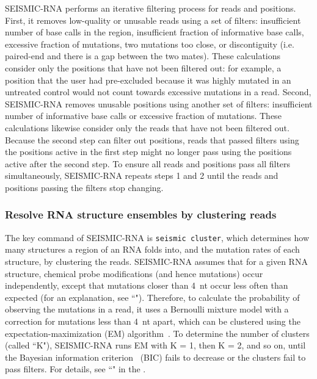 \documentclass[unnumsec,webpdf,contemporary,large]{oup-authoring-template}%
\theoremstyle{thmstyleone}%
\theoremstyle{thmstyletwo}%
\theoremstyle{thmstylethree}%
\begin{document}
SEISMIC-RNA performs an iterative filtering process for reads and positions.
First, it removes low-quality or unusable reads using a set of filters: insufficient number of base calls in the region, insufficient fraction of informative base calls, excessive fraction of mutations, two mutations too close, or discontiguity (i.e. paired-end and there is a gap between the two mates).
These calculations consider only the positions that have not been filtered out: for example, a position that the user had pre-excluded because it was highly mutated in an untreated control would not count towards excessive mutations in a read.
Second, SEISMIC-RNA removes unusable positions using another set of filters: insufficient number of informative base calls or excessive fraction of mutations.
These calculations likewise consider only the reads that have not been filtered out.
Because the second step can filter out positions, reads that passed filters using the positions active in the first step might no longer pass using the positions active after the second step.
To ensure all reads and positions pass all filters simultaneously, SEISMIC-RNA repeats steps 1 and 2 until the reads and positions passing the filters stop changing.

\subsubsection{Resolve RNA structure ensembles by clustering reads}
\label{seismic-cluster}

The key command of SEISMIC-RNA is \verb|seismic cluster|, which determines how many structures a region of an RNA folds into, and the mutation rates of each structure, by clustering the reads.
SEISMIC-RNA assumes that for a given RNA structure, chemical probe modifications (and hence mutations) occur independently, except that mutations closer than 4~nt occur less often than expected (for an explanation, see ``").
Therefore, to calculate the probability of observing the mutations in a read, it uses a Bernoulli mixture model with a correction for mutations less than 4~nt apart, which can be clustered using the expectation-maximization (EM) algorithm~\cite{Dempster1977}.
To determine the number of clusters (called ``K"), SEISMIC-RNA runs EM with K = 1, then K = 2, and so on, until the Bayesian information criterion~\cite{Schwarz1978} (BIC) fails to decrease or the clusters fail to pass filters.
For details, see ``" in the .
\end{document}
